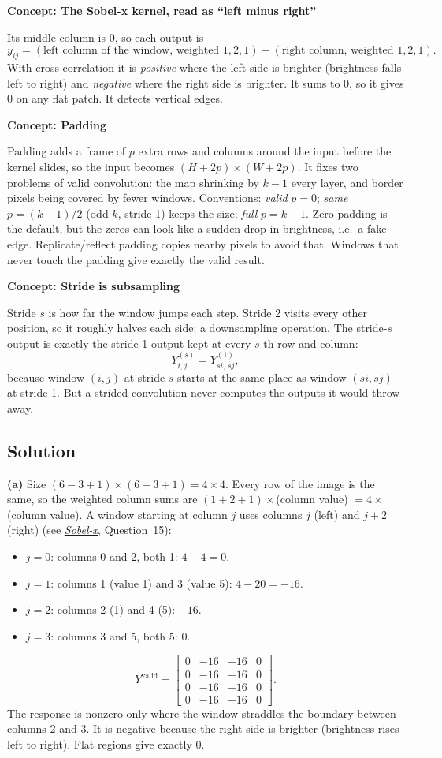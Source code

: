 \documentclass[12pt,a4paper]{article}
\newcommand{\concept}[2]{\par\medskip\phantomsection\label{#1}{\large\bfseries\color{blue!50!black} Concept: #2}\par}
\newcommand{\seeconcept}[3]{(see \hyperref[#1]{\textit{#2}}, Question~#3)}
\begin{document}
\concept{c:sobel}{The Sobel-x kernel, read as ``left minus right''}
Its middle column is 0, so each output is
\[
y_{ij}=(\text{left column of the window, weighted }1,2,1)-(\text{right column, weighted }1,2,1).
\]
With cross-correlation it is \emph{positive} where the left side is brighter (brightness falls left to right) and \emph{negative} where the right side is brighter. It sums to 0, so it gives 0 on any flat patch. It detects vertical edges.

\concept{c:padding}{Padding}
Padding adds a frame of $p$ extra rows and columns around the input before the kernel slides, so the input becomes $(H+2p)\times(W+2p)$. It fixes two problems of valid convolution: the map shrinking by $k-1$ every layer, and border pixels being covered by fewer windows. Conventions: \emph{valid} $p=0$; \emph{same} $p=(k-1)/2$ (odd $k$, stride 1) keeps the size; \emph{full} $p=k-1$. Zero padding is the default, but the zeros can look like a sudden drop in brightness, i.e.\ a fake edge. Replicate/reflect padding copies nearby pixels to avoid that. Windows that never touch the padding give exactly the valid result.

\concept{c:stride}{Stride is subsampling}
Stride $s$ is how far the window jumps each step. Stride 2 visits every other position, so it roughly halves each side: a downsampling operation. The stride-$s$ output is exactly the stride-1 output kept at every $s$-th row and column:
\[
Y^{(s)}_{i,j}=Y^{(1)}_{si,\,sj},
\]
because window $(i,j)$ at stride $s$ starts at the same place as window $(si,sj)$ at stride 1. But a strided convolution never computes the outputs it would throw away.

\subsection*{Solution}
\textbf{(a)} Size $(6-3+1)\times(6-3+1)=4\times4$. Every row of the image is the same, so the weighted column sums are $(1+2+1)\times$(column value) $=4\times$(column value). A window starting at column $j$ uses columns $j$ (left) and $j+2$ (right) \seeconcept{c:sobel}{Sobel-x}{15}:
\begin{itemize}[nosep]
\item $j=0$: columns 0 and 2, both 1: $4-4=0$.
\item $j=1$: columns 1 (value 1) and 3 (value 5): $4-20=-16$.
\item $j=2$: columns 2 (1) and 4 (5): $-16$.
\item $j=3$: columns 3 and 5, both 5: $0$.
\end{itemize}
\[
Y^{\text{valid}}=\begin{bmatrix}0&-16&-16&0\\0&-16&-16&0\\0&-16&-16&0\\0&-16&-16&0\end{bmatrix}.
\]
The response is nonzero only where the window straddles the boundary between columns 2 and 3. It is negative because the right side is brighter (brightness rises left to right). Flat regions give exactly 0.
\end{document}
